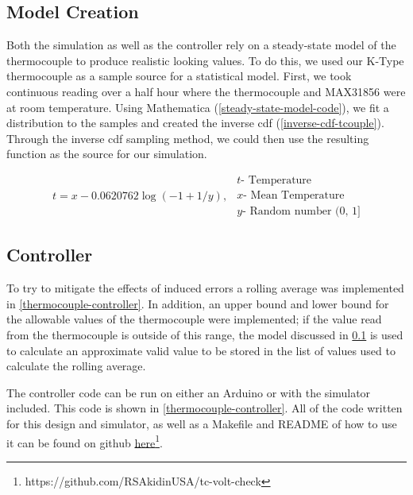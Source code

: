 \subsection{Model Creation}\label{model-creation}
Both the simulation as well as the controller rely on a steady-state model of the thermocouple to produce realistic looking values. To do this, we used our K-Type thermocouple as a sample source for a statistical model. First, we took continuous reading over a half hour where the thermocouple and MAX31856 were at room temperature. Using Mathematica (\cref{steady-state-model-code}), we fit a distribution to the samples and created the inverse \ac{cdf} (\cref{inverse-cdf-tcouple}). Through the inverse \ac{cdf} sampling method, we could then use the resulting function as the source for our simulation. 

\begin{equation}\label{inverse-cdf-tcouple}
\begin{split}
t = x - 0.0620762 \log({-1 + 1/y}),
\end{split}
\begin{split}
t \text{- Temperature}\\
x \text{- Mean Temperature}\\
y \text{- Random number (0, 1]}
\end{split}
\end{equation}

\subsection{Controller}
To try to mitigate the effects of induced errors a rolling average was implemented in \cref{thermocouple-controller}. In addition, an upper bound and lower bound for the allowable values of the thermocouple were implemented; if the value read from the thermocouple is outside of this range, the model discussed in \cref{model-creation} is used to calculate an approximate valid value to be stored in the list of values used to calculate the rolling average.

The controller code can be run on either an Arduino or with the simulator included. This code is shown in \cref{thermocouple-controller}. All of the code written for this design and simulator, as well as a Makefile and README of how to use it can be found on github  \href{https://github.com/RSAkidinUSA/tc-volt-check}{here}\footnote{https://github.com/RSAkidinUSA/tc-volt-check}.

